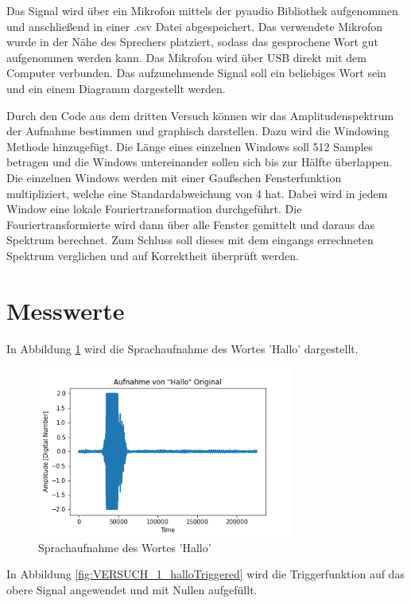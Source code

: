 \documentclass[12pt, oneside, a4paper, \docLanguage]{report}
\begin{document}
Das Signal wird über ein Mikrofon mittels der pyaudio Bibliothek aufgenommen und anschließend in einer .csv Datei abgespeichert. Das verwendete Mikrofon wurde in der Nähe des Sprechers platziert, sodass das gesprochene Wort gut aufgenommen werden kann. Das Mikrofon wird über USB direkt mit dem Computer verbunden. Das aufzunehmende Signal soll ein beliebiges Wort sein und ein einem Diagramm dargestellt werden.

Durch den Code aus dem dritten Versuch können wir das Amplitudenspektrum der Aufnahme bestimmen und graphisch darstellen. Dazu wird die Windowing Methode hinzugefügt. Die Länge eines einzelnen Windows soll 512 Samples betragen und die Windows untereinander sollen sich bis zur Hälfte überlappen. Die einzelnen Windows werden mit einer Gaußschen Fensterfunktion multipliziert, welche eine Standardabweichung von 4 hat. Dabei wird in jedem Window eine lokale Fouriertransformation durchgeführt. Die Fouriertransformierte wird dann über alle Fenster gemittelt und daraus das Spektrum berechnet. Zum Schluss soll dieses mit dem eingangs errechneten Spektrum verglichen und auf Korrektheit überprüft werden.

\section{Messwerte}
\label{chap:VERSUCH_1_MESSWERTE}
In Abbildung \ref{fig:VERSUCH_1_halloOriginal} wird die Sprachaufnahme des Wortes 'Hallo' dargestellt.

\begin{figure}[H]
	\centering\small
	\includegraphics[width=0.75\textwidth]{media/AufnahmeHalloOriginal.png}
	\caption{Sprachaufnahme des Wortes 'Hallo'}
	\label{fig:VERSUCH_1_halloOriginal}
\end{figure}

In Abbildung \ref{fig:VERSUCH_1_halloTriggered} wird die Triggerfunktion auf das obere Signal angewendet und mit Nullen aufgefüllt.
\end{document}
